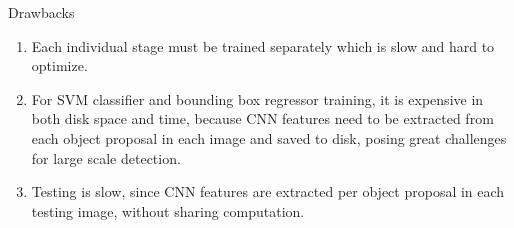 \documentclass{beamer}
\begin{document}
\begin{frame}{Drawbacks}
	\begin{enumerate}
		\item Each individual stage must be trained separately which is slow and hard to optimize.
		\item For SVM classifier and bounding box regressor training, it is expensive in both disk space and time, because CNN features need to be extracted from each object proposal in each image and saved to disk, posing great challenges for large scale detection.
		\item Testing is slow, since CNN features are extracted per object proposal in each testing image, without sharing computation.
	\end{enumerate}
\end{frame}
\end{document}
